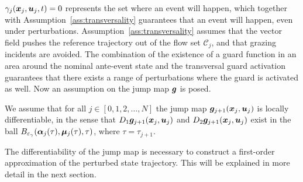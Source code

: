 \documentclass[../DC2017114Bouma.tex]{subfiles}
\begin{document}

$\gamma_j({\boldsymbol{x}}_j,{\boldsymbol{u}}_j,t) = 0$ represents the set where an event will happen, which together with Assumption~\ref{ass:transversality} guarantees that an event will happen, even under perturbations. Assumption~\ref{ass:transversality} assumes that the vector field pushes the reference trajectory out of the flow set $\mathcal{C}_j$, and that grazing incidents are avoided. The combination of the existence of a guard function in an area around the nominal ante-event state and the transversal guard activation guarantees that there exists a range of perturbations where the guard is activated as well. Now an assumption on the jump map ${\boldsymbol{g}}$ is posed.

\begin{myass}\label{ass:jump}
We assume that for all $j \in [0,1,2,\dots,N]$ the jump map ${\boldsymbol{g}}_{j+1}({\boldsymbol{x}}_j,{\boldsymbol{u}}_j)$ is locally differentiable, in the sense that $D_1{\boldsymbol{g}}_{j+1}({\boldsymbol{x}}_j,{\boldsymbol{u}}_j)$ and $D_2{\boldsymbol{g}}_{j+1}({\boldsymbol{x}}_j,{\boldsymbol{u}}_j)$ exist in the ball $B_{\varepsilon_{\gamma}}(\boldsymbol{\alpha}_j(\tau),\boldsymbol{\mu}_j(\tau),\tau)$, where $\tau = \tau_{j+1}$.
\end{myass}

The differentiability of the jump map is necessary to construct a first-order approximation of the perturbed state trajectory. This will be explained in more detail in the next section.
\end{document}
